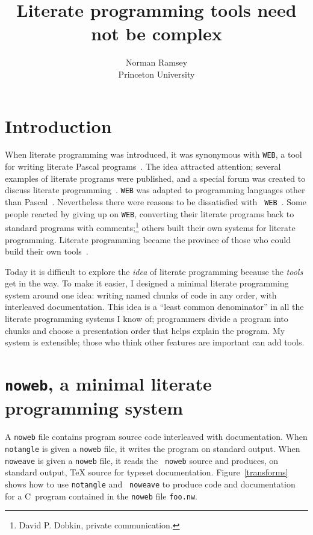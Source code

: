 \title{Literate programming tools need not be complex}
\author{Norman Ramsey\\Princeton University}
\setcounter{secnumdepth}{0}

\def\remark#1{\marginpar{\raggedright\hbadness=10000\footnotesize\it #1}}




\maketitle

\section{Introduction}
When literate programming was
introduced, it was synonymous with {\tt WEB}, a tool
for writing literate Pascal programs~\cite{knuth:literate}.
The idea attracted attention; several examples of literate
programs were published, and a special forum was created to discuss literate
programming~\cite{bentley:lp1,bentley:lp2,gries:pearls,denning:announcing}.
{\tt WEB} was  adapted to programming languages other than
Pascal~\cite{thimbleby:cweb,guntermann:cweb,levy:cweb,sewell:mangle,ramsey:building}.
Nevertheless there were reasons to be dissatisfied with {\tt
WEB}~\cite{ramsey:literate}.
Some people reacted by giving up on {\tt WEB}, converting their literate
programs back to standard programs with
comments;\footnote{David P. Dobkin, private communication.}
others built their own systems for literate programming.
Literate programming became the province of those who could build
their own tools~\cite{cvw:assessment}.

Today it is difficult to explore the {\em idea} of literate programming
because the {\em tools} get in the way.
To make it easier, I designed a minimal literate programming system
around one idea: writing named chunks of code in any order, with
interleaved documentation. 
This idea is a ``least common denominator'' in all the literate
programming systems I know of;
programmers divide a program into chunks and choose a presentation order
that helps explain the program.
My system is extensible; those who think
other features are important can add tools.

\section{{\tt noweb}, a minimal literate programming system}
A {\tt noweb} file contains program source code interleaved with documentation.
When {\tt notangle} is given a {\tt noweb} file, it writes the program
 on standard output. 
When {\tt noweave} is given a {\tt noweb} file, it reads the {\tt
noweb} source and produces, on standard output, {\TeX} source for
typeset documentation.
Figure~\ref{transforms} shows how to use {\tt notangle} and {\tt
noweave} to produce code and documentation for a C~program contained
in the {\tt noweb} file {\tt foo.nw}.

